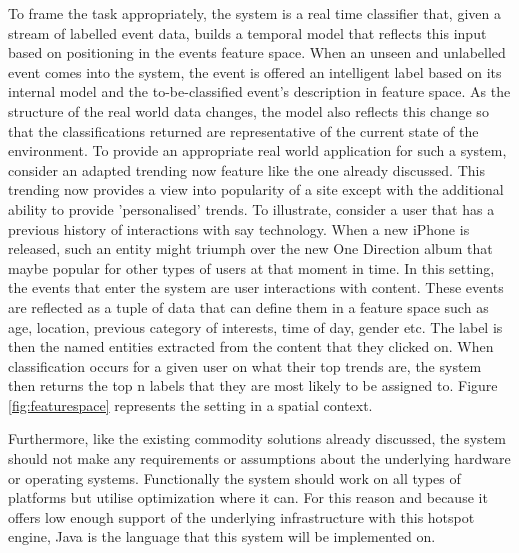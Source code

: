 \documentclass[a4paper,11pt]{scrreprt}
\begin{document}
To frame the task appropriately, the system is a real time classifier that, given a stream of labelled event data, builds a temporal model that reflects this input based on positioning in the events feature space. When an unseen and unlabelled event comes into the system, the event is offered an intelligent label based on its internal model and the to-be-classified event's description in feature space. As the structure of the real world data changes, the model also reflects this change so that the classifications returned are representative of the current state of the environment. To provide an appropriate real world application for such a system, consider an adapted trending now feature like the one already discussed. This trending now provides a view into popularity of a site except with the additional ability to provide 'personalised' trends. To illustrate, consider a user that has a previous history of interactions with say technology. When a new iPhone is released, such an entity might triumph over the new One Direction album that maybe popular for other types of users at that moment in time. In this setting, the events that enter the system are user interactions with content. These events are reflected as a tuple of data that can define them in a feature space such as age, location, previous category of interests, time of day, gender etc. The label is then the named entities extracted from the content that they clicked on. When classification occurs for a given user on what their top trends are, the system then returns the top n labels that they are most likely to be assigned to. Figure \ref{fig:featurespace} represents the setting in a spatial context.

Furthermore, like the existing commodity solutions already discussed, the system should not make any requirements or assumptions about the underlying hardware or operating systems. Functionally the system should work on all types of platforms but utilise optimization where it can. For this reason and because it offers low enough support of the underlying infrastructure with this hotspot engine, Java is the language that this system will be implemented on.
 
\end{document}
